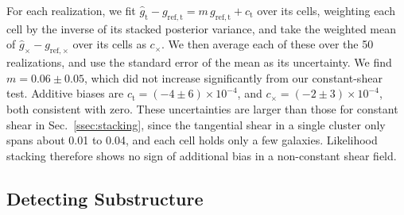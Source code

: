 For each realization, we fit $\hat{g}_\mathrm{t} - g_{\mathrm{ref,t}} = m\, g_{\mathrm{ref,t}} + c_\mathrm{t}$ over its cells, weighting each cell by the inverse of its stacked posterior variance, and take the weighted mean of $\hat{g}_\times - g_{\mathrm{ref},\times}$ over its cells as $c_\times$. We then average each of these over the 50 realizations, and use the standard error of the mean as its uncertainty. We find $m = 0.06 \pm 0.05$, which did not increase significantly from our constant-shear test. Additive biases are $c_\mathrm{t} = (-4 \pm 6) \times 10^{-4}$, and $c_\times = (-2 \pm 3) \times 10^{-4}$, both consistent with zero. These uncertainties are larger than those for constant shear in Sec.~\ref{ssec:stacking}, since the tangential shear in a single cluster only spans about 0.01 to 0.04, and each cell holds only a few galaxies.  Likelihood stacking therefore shows no sign of additional bias in a non-constant shear field.

\subsection{Detecting Substructure}
\label{ssec:substructure}

